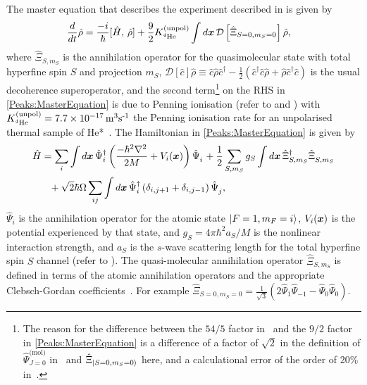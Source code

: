 The master equation that describes the experiment described in  is given by
\begin{align}
    \label{Peaks:MasterEquation}
    \frac{d }{d t}\hat{\rho} &= \frac{-i}{\hbar} [\hat{H},\, \hat{\rho} ] + \frac{9}{2} K^\text{(unpol)}_{^{4}\text{He}} \int d \vect{x}\, \mathcal{D}\left[\hat{\Xi}_{S=0,m_S=0} \right] \hat{\rho},
\end{align}
where $\displaystyle\hat{\Xi}_{S, m_S}$ is the annihilation operator for the quasimolecular state with total hyperfine spin $S$ and projection $m_S$, $\mathcal{D}[\hat{c}]\hat{\rho} \equiv \hat{c}\hat{\rho}\hat{c}^\dagger - \frac{1}{2}(\hat{c}^\dagger \hat{c} \hat{\rho} + \hat{\rho} \hat{c}^\dagger \hat{c})$ is the usual decoherence superoperator, and the second term\footnote{The reason for the difference between the ${54}/{5}$ factor in~\citet{Dall:2009} and the $9/2$ factor in \eqref{Peaks:MasterEquation} is a difference of a factor of $\sqrt{2}$ in the definition of $\hat{\Psi}_{J=0}^{\text{(mol)}}$ in~\citep{Dall:2009} and $\displaystyle\hat{\Xi}_{\left|S=0, m_S=0\right>}$ here, and a calculational error of the order of 20\% in~\citep{Dall:2009}.} on the RHS in \eqref{Peaks:MasterEquation} is due to Penning ionisation (refer to  and ) with $K^\text{(unpol)}_{^{4}\text{He}}=\unit[7.7\times 10^{-17}]{m\textsuperscript{3}s\textsuperscript{-1}}$ the Penning ionisation rate for an unpolarised thermal sample of He*~\citep{Stas:2006kx}. The Hamiltonian in \eqref{Peaks:MasterEquation} is given by
\begin{align}
    \label{Peaks:3DHamiltonian}
    \begin{split}
    \hat{H} &= \sum_i \int d\vect{x}\, \hat{\Psi}_i^\dagger \left(\frac{-\hbar^2 \nabla^2}{2 M} + V_i(\vect{x})\right)\hat{\Psi}_i^{\phantom{\dagger}} + \frac{1}{2}\sum_{S, m_S} g_{S}\int d\vect{x}\, \hat{\Xi}_{S, m_S}^\dagger \hat{\Xi}_{S, m_S}^{\phantom{\dagger}}\\
            &\phantom{=} + \sqrt{2} \hbar \Omega \sum_{i j}\int d\vect{x}\, \hat{\Psi}_i^\dagger \left(\delta_{i, j+1} + \delta_{i, j-1}\right) \hat{\Psi}_j^{\phantom{\dagger}},
    \end{split}
\end{align}
$\displaystyle \hat{\Psi}_i$ is the annihilation operator for the atomic state $\displaystyle {\ensuremath{\left|F=1, m_F=i\right>}}$, $V_i(\bm{x})$ is the potential experienced by that state, and $g_S = 4 \pi \hbar^2 a_S/M$ is the nonlinear interaction strength, and $a_S$ is the $s$-wave scattering length for the total hyperfine spin $S$ channel (refer to ). The quasi-molecular annihilation operator $\displaystyle \hat{\Xi}_{S, m_S}$ is defined in terms of the atomic annihilation operators and the appropriate Clebsch-Gordan coefficients~\citep{Ho:1998}. For example $\displaystyle \hat{\Xi}_{S=0, m_S=0} = \frac{1}{\sqrt{3}} \left( 2 \hat{\Psi}_1 \hat{\Psi}_{-1} - \hat{\Psi}_0 \hat{\Psi}_0\right)$.

